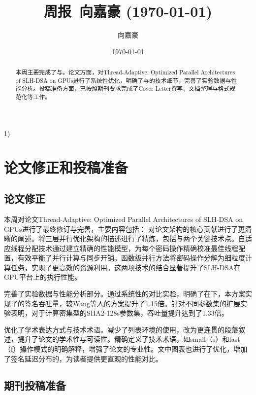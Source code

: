 \documentclass{article}
\title{周报~向嘉豪 (\today)}
\author{向嘉豪}
\date{\today}
\begin{document}
\maketitle

\begin{abstract}
  本周主要完成了与。论文方面，对Thread-Adaptive: Optimized Parallel Architectures of SLH-DSA on GPUs进行了系统性优化，明确了与的技术细节，完善了实验数据与性能分析。投稿准备方面，已按照期刊要求完成了Cover Letter撰写、文档整理与格式规范化等工作。
\end{abstract}

\begin{weekplan}
1) 
\end{weekplan}

\section{论文修正和投稿准备}

\subsection{论文修正}

本周对论文Thread-Adaptive: Optimized Parallel Architectures of SLH-DSA on GPUs进行了最终修订与完善，主要内容包括：
对论文架构的核心贡献进行了更清晰的阐述。将三层并行优化架构的描述进行了精炼，包括与两个关键技术点。自适应线程分配技术通过建立精确的性能模型，为每个密码操作精确校准最佳线程配置，有效平衡了并行计算与同步开销。函数级并行方法将密码操作分解为细粒度计算任务，实现了更高效的资源利用。这两项技术的结合显著提升了SLH-DSA在GPU平台上的执行性能。

完善了实验数据与性能分析部分。通过系统性的对比实验，明确了在下，本方案实现了的签名吞吐量，较Wang等人的方案提升了1.15倍。针对不同参数集的扩展实验表明，对于计算密集型的SHA2-128s参数集，吞吐量提升达到了1.33倍。

优化了学术表达方式与技术术语。减少了列表环境的使用，改为更连贯的段落叙述，提升了论文的学术性与可读性。精确定义了技术术语，如small（s）和fast（f）操作模式的明确解释，增强了论文的专业性。文中图表也进行了优化，增加了签名延迟分布的，为读者提供更直观的性能对比。

\subsection{期刊投稿准备}
\end{document}
